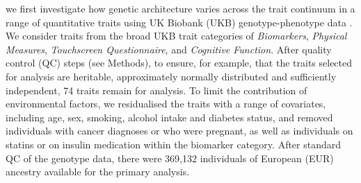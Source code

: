 \documentclass[12pt]{zHenriquesLab-StyleBioRxiv}
\begin{document}
{%
% 
% 
% 
% 
% 
% 
% 
% 
% 
% 
% 
% 
% 
%
% 
% 
% 
% 
% 
% 
% 
% 
% 
% 
% 
% 
% 
% 
% 
% 
% 
% 
% 
{ we first investigate how genetic architecture 
varies across the trait continuum in a range of 
quantitative traits using UK Biobank (UKB) 
genotype-phenotype data \cite{Bycroft2018}. We consider traits 
from the broad UKB trait categories of \emph{Biomarkers}, 
\emph{Physical Measures}, \emph{Touchscreen Questionnaire}, and \emph{Cognitive Function}. 
After quality control (QC) steps (see Methods), to ensure, for example, 
that the traits selected for analysis are heritable, approximately normally distributed and 
sufficiently independent, 74 traits remain for analysis. 
To limit the contribution of environmental factors, we 
residualised the traits with a range of covariates, including 
age, sex, smoking, alcohol intake and diabetes status, and 
removed individuals with cancer diagnoses or who 
were pregnant, as well as individuals on statins or on 
insulin medication within the biomarker category. 
After standard QC of the genotype data,
there were 369,132 individuals of European (EUR)
ancestry available for the primary analysis.

}}
\end{document}
